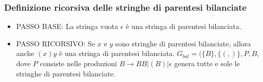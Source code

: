 \subsubsection{Definizione ricorsiva delle stringhe di parentesi bilanciate}
\begin{itemize}
    \item PASSO BASE: La stringa vuota $\epsilon$ è una stringa di parentesi bilanciata.
    \item PASSO RICORSIVO: Se $x$ e $y$ sono stringhe di parentesi bilanciate, allora anche $(x) y$ è una stringa di parentesi bilanciata.
$G_{b a l}=(\{B\},\{(,)\}, P, B$, dove $P$ consiste nelle produzioni $B \rightarrow B B|(B)| \epsilon$
genera tutte e sole le stringhe di parentesi bilanciate.
\end{itemize}






\let\cleardoublepage\clearpage
\subsubsection{}
